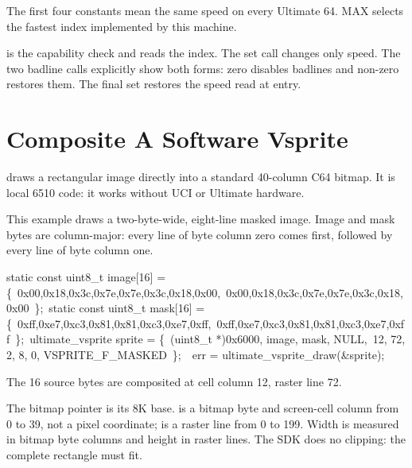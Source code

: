 \begin{resultbox}
The first four constants mean the same speed on every Ultimate 64. MAX selects
the fastest index implemented by this machine.
\end{resultbox}

 is the capability check and
 reads the index. The set call changes only speed.
The two badline calls explicitly show both forms: zero disables badlines and
non-zero restores them. The final set restores the speed read at entry.


\section{Composite A Software Vsprite}

 draws a rectangular image directly into a
standard 40-column C64 bitmap. It is local 6510 code: it works without UCI or
Ultimate hardware.

This example draws a two-byte-wide, eight-line masked image. Image and mask
bytes are column-major: every line of byte column zero comes first, followed
by every line of byte column one.

\begin{listingbox}
static const uint8\_t image[16] = \{\
\hspace*{1em}0x00,0x18,0x3c,0x7e,0x7e,0x3c,0x18,0x00,\
\hspace*{1em}0x00,0x18,0x3c,0x7e,0x7e,0x3c,0x18,0x00\
\};\
static const uint8\_t mask[16] = \{\
\hspace*{1em}0xff,0xe7,0xc3,0x81,0x81,0xc3,0xe7,0xff,\
\hspace*{1em}0xff,0xe7,0xc3,0x81,0x81,0xc3,0xe7,0xff\
\};\
ultimate\_vsprite sprite = \{\
\hspace*{1em}(uint8\_t *)0x6000, image, mask, NULL,\
\hspace*{1em}12, 72, 2, 8, 0, VSPRITE\_F\_MASKED\
\};\
\
err = ultimate\_vsprite\_draw(\&sprite);
\end{listingbox}

\begin{resultbox}
The 16 source bytes are composited at cell column 12, raster line 72.
\end{resultbox}

The bitmap pointer is its 8K base.  is a bitmap byte and screen-cell
column from 0 to 39, not a pixel coordinate;  is a raster line from 0
to 199. Width is measured in bitmap byte columns and height in raster lines.
The SDK does no clipping: the complete rectangle must fit.

